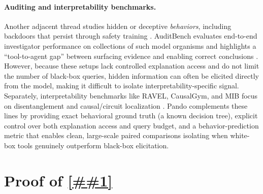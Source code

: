 \documentclass{article} %
\newcommand{\Cref}[1]{\ref{##1}}
\newcommand{\bench}{Pando}
\begin{document}
\paragraph{Auditing and interpretability benchmarks.}
Another adjacent thread studies hidden or deceptive \emph{behaviors}, including backdoors that persist through safety training \citep{hubinger2024sleeper}.
AuditBench evaluates end-to-end investigator performance on collections of such model organisms and highlights a ``tool-to-agent gap'' between surfacing evidence and enabling correct conclusions \citep{auditbench2026}.
However, because these setups lack controlled explanation access and do not limit the number of black-box queries, hidden information can often be elicited directly from the model, making it difficult to isolate interpretability-specific signal.
Separately, interpretability benchmarks like RAVEL, CausalGym, and MIB focus on disentanglement and causal/circuit localization \citep{huang2024ravel,arora2024causalgym,mueller2025mib}.
\bench{} complements these lines by providing exact behavioral ground truth (a known decision tree), explicit control over both explanation access and query budget, and a behavior-prediction metric that enables clean, large-scale paired comparisons isolating when white-box tools genuinely outperform black-box elicitation.

\section{Proof of \Cref{prop:elicitation_conf}}
\label{app:elicitation_conf_proof}
\end{document}
